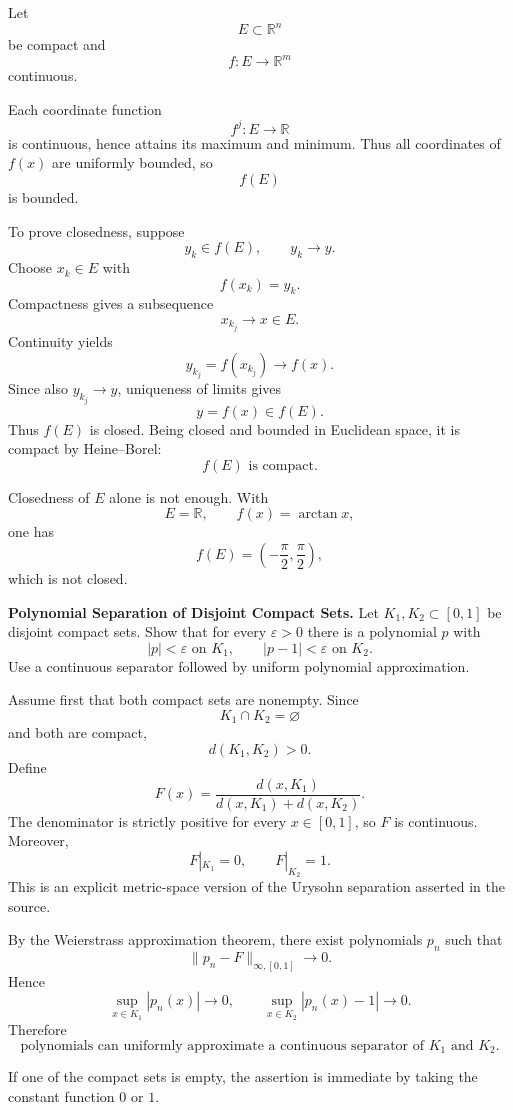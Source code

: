 \begin{solution}
Let
\[
E\subset\mathbb R^n
\]
be compact and
\[
f:E\to\mathbb R^m
\]
continuous.

Each coordinate function
\[
f^j:E\to\mathbb R
\]
is continuous, hence attains its maximum and minimum. Thus all coordinates of \(f(x)\) are
uniformly bounded, so
\[
f(E)
\]
is bounded.

To prove closedness, suppose
\[
y_k\in f(E),
\qquad
y_k\to y.
\]
Choose \(x_k\in E\) with
\[
f(x_k)=y_k.
\]
Compactness gives a subsequence
\[
x_{k_j}\to x\in E.
\]
Continuity yields
\[
y_{k_j}=f(x_{k_j})\to f(x).
\]
Since also \(y_{k_j}\to y\), uniqueness of limits gives
\[
y=f(x)\in f(E).
\]
Thus \(f(E)\) is closed. Being closed and bounded in Euclidean space, it is compact by
Heine--Borel:
\[
\boxed{f(E)\text{ is compact}.}
\]

Closedness of \(E\) alone is not enough. With
\[
E=\mathbb R,
\qquad
f(x)=\arctan x,
\]
one has
\[
f(E)=\left(-\frac\pi2,\frac\pi2\right),
\]
which is not closed.
\end{solution}


\begin{problem}[CP-II-0468]
\label{prob:cp-ii-0468}
\textbf{Polynomial Separation of Disjoint Compact Sets.}
Let \(K_1,K_2\subset[0,1]\) be disjoint compact sets. Show that for every \(\varepsilon>0\) there is a polynomial \(p\) with
\[
|p|<\varepsilon\text{ on }K_1,\qquad |p-1|<\varepsilon\text{ on }K_2.
\]
Use a continuous separator followed by uniform polynomial approximation.
\end{problem}

\begin{solution}
Assume first that both compact sets are nonempty. Since
\[
K_1\cap K_2=\varnothing
\]
and both are compact,
\[
d(K_1,K_2)>0.
\]
Define
\[
F(x)
=
\frac{d(x,K_1)}
{d(x,K_1)+d(x,K_2)}.
\]
The denominator is strictly positive for every \(x\in[0,1]\), so \(F\) is continuous.
Moreover,
\[
F|_{K_1}=0,
\qquad
F|_{K_2}=1.
\]
This is an explicit metric-space version of the Urysohn separation asserted in the source.

By the Weierstrass approximation theorem, there exist polynomials \(p_n\) such that
\[
\|p_n-F\|_{\infty,[0,1]}\longrightarrow0.
\]
Hence
\[
\sup_{x\in K_1}|p_n(x)|
\longrightarrow0,
\qquad
\sup_{x\in K_2}|p_n(x)-1|
\longrightarrow0.
\]
Therefore
\[
\boxed{
\text{polynomials can uniformly approximate a continuous separator of }K_1\text{ and }K_2.
}
\]

If one of the compact sets is empty, the assertion is immediate by taking the constant
function \(0\) or \(1\).
\end{solution}


